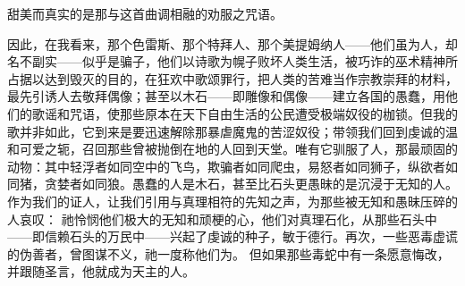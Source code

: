 \par

甜美而真实的是那与这首曲调相融的劝服之咒语。\par

因此，在我看来，那个色雷斯、那个特拜人、那个美提姆纳人——他们虽为人，却名不副实——似乎是骗子，他们以诗歌为幌子败坏人类生活，被巧诈的巫术精神所占据以达到毁灭的目的，在狂欢中歌颂罪行，把人类的苦难当作宗教崇拜的材料，最先引诱人去敬拜偶像；甚至以木石——即雕像和偶像——建立各国的愚蠢，用他们的歌谣和咒语，使那些原本在天下自由生活的公民遭受极端奴役的枷锁。但我的歌并非如此，它到来是要迅速解除那暴虐魔鬼的苦涩奴役；带领我们回到虔诚的温和可爱之轭，召回那些曾被抛倒在地的人回到天堂。唯有它驯服了人，那最顽固的动物：其中轻浮者如同空中的飞鸟，欺骗者如同爬虫，易怒者如同狮子，纵欲者如同猪，贪婪者如同狼。愚蠢的人是木石，甚至比石头更愚昧的是沉浸于无知的人。作为我们的证人，让我们引用与真理相符的先知之声，为那些被无知和愚昧压碎的人哀叹：  祂怜悯他们极大的无知和顽梗的心，他们对真理石化，从那些石头中——即信赖石头的万民中——兴起了虔诚的种子，敏于德行。再次，一些恶毒虚谎的伪善者，曾图谋不义，祂一度称他们为。 但如果那些毒蛇中有一条愿意悔改，并跟随圣言，他就成为天主的人。\par

